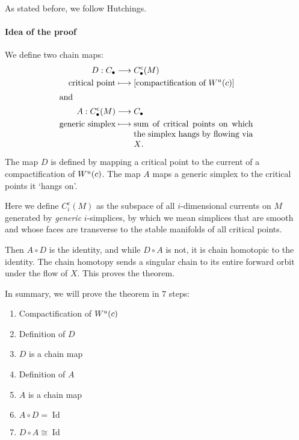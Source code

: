 \begin{myproof}
    As stated before, we follow Hutchings.
    \paragraph{Idea of the proof}
    
    We define two chain maps:
    \begin{align*}
        D: C_\bul &\longrightarrow C_\bul^{\text{c}}(M) \\
         \text{critical point}&\longmapsto [\text{compactification of $\unstable{c}$}]\\
         \shortintertext{and}
        A: C_\bul^{\text{c}}(M) &\longrightarrow C_\bul \\
         \text{generic simplex} &\longmapsto 
         \parbox[t][][t]{5cm}{sum of critical points on which the simplex hangs by flowing via $X$.}
    \end{align*}
\begin{marginfigure}
    \centering
    \caption{The map $D$ is defined by mapping a critical point to the current of a compactification of $W^u(c)$. The map $A$ maps a generic simplex to the critical points it `hangs on'.}
    \label{fig:idea-of-the-proof-maps-a-and-d}
\end{marginfigure}

    Here we define $C_i^{\text{c}}(M)$ as the subspace of all  $i$-dimensional currents on $M$ generated by \emph{generic} $i$-simplices, by which we mean simplices that are smooth and whose faces are transverse to the stable manifolds of all critical points.


    Then $A  \circ D$ is the identity, and while $D  \circ  A$ is not, it is chain homotopic to the identity.
    The chain homotopy sends a singular chain to its entire forward orbit under the flow of $X$.
    This proves the theorem.

    In summary, we will prove the theorem in $7$ steps:
    \begin{enumerate}
        \item Compactification of $W^u(c)$
        \item Definition of $D$
        \item $D$ is a chain map
        \item Definition of $A$
        \item $A$ is a chain map
        \item $A  \circ D = \operatorname{Id}$
        \item  $D  \circ A \cong \operatorname{Id}$
    \end{enumerate}


\end{myproof}
